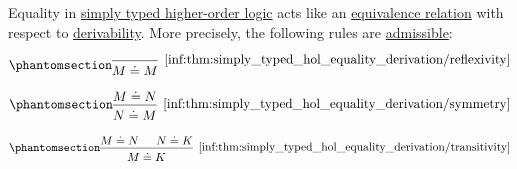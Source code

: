 \begin{proposition}\label{thm:simply_typed_hol_equality_derivation}
  Equality in \hyperref[def:simply_typed_hol]{simply typed higher-order logic} acts like an \hyperref[def:equivalence_relation]{equivalence relation} with respect to \hyperref[def:simply_typed_hol_proof_tree]{derivability}. More precisely, the following rules are \hyperref[con:inference_rule_admissibility]{admissible}:

  \begin{paracol}{3}
    \begin{nthcolumn}{0}
      \ParacolAlignmentHack
      \begin{equation*}\taglabel[\ensuremath{ \logic{HOL}_{=R} }]{inf:thm:simply_typed_hol_equality_derivation/reflexivity}
        \begin{prooftree}
          \infer0[\ref{inf:thm:simply_typed_hol_equality_derivation/reflexivity}]{ M \syneq M }.
        \end{prooftree}
      \end{equation*}
    \end{nthcolumn}

    \begin{nthcolumn}{1}
      \ParacolAlignmentHack
      \begin{equation*}\taglabel[\ensuremath{ \logic{HOL}_{=S} }]{inf:thm:simply_typed_hol_equality_derivation/symmetry}
        \begin{prooftree}
          \hypo{ M \syneq N }
          \infer1[\ref{inf:thm:simply_typed_hol_equality_derivation/symmetry}]{ N \syneq M }.
        \end{prooftree}
      \end{equation*}
    \end{nthcolumn}

    \begin{nthcolumn}{2}
      \ParacolAlignmentHack
      \begin{equation*}\taglabel[\ensuremath{ \logic{HOL}_{=T} }]{inf:thm:simply_typed_hol_equality_derivation/transitivity}
        \begin{prooftree}
          \hypo{ M \syneq N }
          \hypo{ N \syneq K }
          \infer2[\ref{inf:thm:simply_typed_hol_equality_derivation/transitivity}]{ M \syneq K }.
        \end{prooftree}
      \end{equation*}
    \end{nthcolumn}
  \end{paracol}
\end{proposition}
